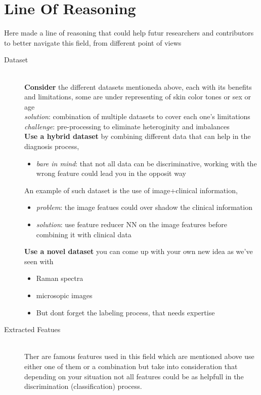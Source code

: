 \section{Line Of Reasoning}
    Here made a line of reasoning that could help futur researchers and contributors to better navigate this field, from different point of views 
    \begin{description}
        \item[Dataset] \hfill \\
            \textbf{Consider} the different datasets mentioneda above, each with its benefits and limitations, some are under representing of skin color tones or sex or age \\
            \emph{solution}: combination of multiple datasets to cover each one's limitations \\
            \emph{challenge}: pre-processing to eliminate heteroginity and imbalances \\

            \textbf{Use a hybrid dataset} by combining different data that can help in the diagnosis process, \\
            \begin{itemize}
                \item \emph{bare in mind}:  that not all data can be discriminative, working with the wrong feature could lead you in the opposit way 
            \end{itemize}
            An example of such dataset is the use of  image+clinical information, \\
            \begin{itemize}
                \item \emph{problem}: the image featues could over shadow the clinical information \\
                \item \emph{solution}: use feature reducer NN on the image features before combining it with clinical data \\ 
            \end{itemize}
                
            \textbf{Use a novel dataset} you can come up with your own new idea as we've seen with
                \begin{itemize}
                    \item Raman spectra
                    \item microsopic images
                    \item But dont forget the labeling process, that needs expertise
                \end{itemize}
        \item[Extracted Featues] \hfill \\ 
            Ther are famous features used in this field which are mentioned above use either one of them or a combination but take into consideration that depending on your situation not all features could be as helpfull in the discrimination (classification) process.
            

\end{description}
